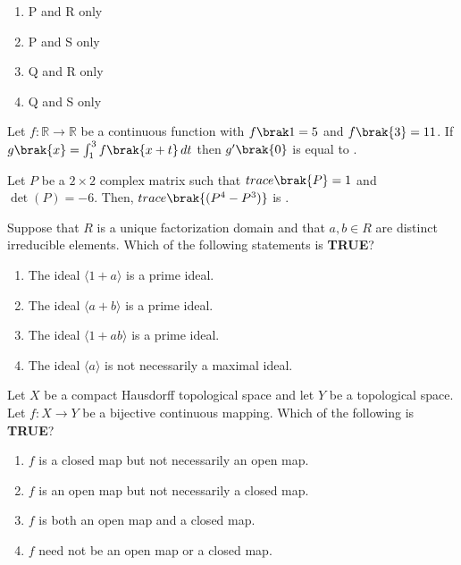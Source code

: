 \begin{multicols}{4}
\begin{enumerate}
    \item P and R only
    \item P and S only
    \item Q and R only
    \item Q and S only
\end{enumerate}
\end{multicols}
\item Let $ f : \mathbb{R} \to \mathbb{R} $ be a continuous function with $ f{\brak1} = 5 $ and $ f\brak{3} = 11 $. If $ g\brak{x} = \int_1^3 f\brak{x + t} \, dt $ then $ g^{\prime}\brak{0} $ is equal to \underline{\hspace{2cm}}.

\item  Let  $P$  be a $ 2 \times 2 $ complex matrix such that $ trace\brak{P} = 1 $ and $ \det(P) = -6 $. Then, $ trace\brak{(P^{4} - P^{3})} $ is \underline{\hspace{2cm}}.

\item  Suppose that  $R$  is a unique factorization domain and that $ a, b \in R $ are distinct irreducible elements. Which of the following statements is \textbf{TRUE}?
\begin{enumerate}
    \item The ideal \( \langle 1 + a \rangle \) is a prime ideal.
    \item The ideal \( \langle a + b \rangle \) is a prime ideal.
    \item The ideal \( \langle 1 + ab \rangle \) is a prime ideal.
    \item The ideal \( \langle a \rangle \) is not necessarily a maximal ideal.
\end{enumerate}

\item  Let  $X$  be a compact Hausdorff topological space and let  $Y$  be a topological space. Let $ f : X \to Y $ be a bijective continuous mapping. Which of the following is \textbf{TRUE}?
\begin{enumerate}
    \item $f$ is a closed map but not necessarily an open map.
    \item $f$ is an open map but not necessarily a closed map.
    \item $f$ is both an open map and a closed map.
    \item $f$ need not be an open map or a closed map.
\end{enumerate}


